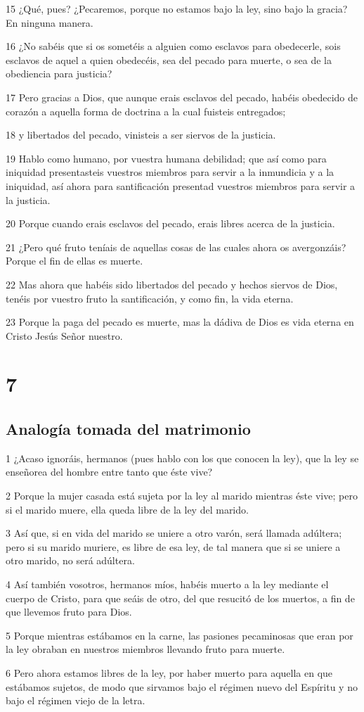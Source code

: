 \par 15 ¿Qué, pues? ¿Pecaremos, porque no estamos bajo la ley, sino bajo la gracia? En ninguna manera.
\par 16 ¿No sabéis que si os sometéis a alguien como esclavos para obedecerle, sois esclavos de aquel a quien obedecéis, sea del pecado para muerte, o sea de la obediencia para justicia?
\par 17 Pero gracias a Dios, que aunque erais esclavos del pecado, habéis obedecido de corazón a aquella forma de doctrina a la cual fuisteis entregados;
\par 18 y libertados del pecado, vinisteis a ser siervos de la justicia.
\par 19 Hablo como humano, por vuestra humana debilidad; que así como para iniquidad presentasteis vuestros miembros para servir a la inmundicia y a la iniquidad, así ahora para santificación presentad vuestros miembros para servir a la justicia.
\par 20 Porque cuando erais esclavos del pecado, erais libres acerca de la justicia.
\par 21 ¿Pero qué fruto teníais de aquellas cosas de las cuales ahora os avergonzáis? Porque el fin de ellas es muerte.
\par 22 Mas ahora que habéis sido libertados del pecado y hechos siervos de Dios, tenéis por vuestro fruto la santificación, y como fin, la vida eterna.
\par 23 Porque la paga del pecado es muerte, mas la dádiva de Dios es vida eterna en Cristo Jesús Señor nuestro.

\chapter{7}

\section*{Analogía tomada del matrimonio}

\par 1 ¿Acaso ignoráis, hermanos (pues hablo con los que conocen la ley), que la ley se enseñorea del hombre entre tanto que éste vive?
\par 2 Porque la mujer casada está sujeta por la ley al marido mientras éste vive; pero si el marido muere, ella queda libre de la ley del marido.
\par 3 Así que, si en vida del marido se uniere a otro varón, será llamada adúltera; pero si su marido muriere, es libre de esa ley, de tal manera que si se uniere a otro marido, no será adúltera.
\par 4 Así también vosotros, hermanos míos, habéis muerto a la ley mediante el cuerpo de Cristo, para que seáis de otro, del que resucitó de los muertos, a fin de que llevemos fruto para Dios.
\par 5 Porque mientras estábamos en la carne, las pasiones pecaminosas que eran por la ley obraban en nuestros miembros llevando fruto para muerte.
\par 6 Pero ahora estamos libres de la ley, por haber muerto para aquella en que estábamos sujetos, de modo que sirvamos bajo el régimen nuevo del Espíritu y no bajo el régimen viejo de la letra.

